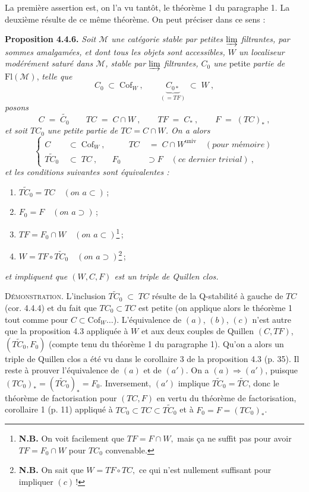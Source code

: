 \documentclass[11pt]{article}
\newcommand{\printedpage}[1]{\marginpar{\footnotesize p.~#1}}
\newcommand{\msp}[1]{\marginpar{\footnotesize [#1]}}
\newcommand{\Fl}{\mathrm{Fl}}
\newcommand{\Cof}{\mathrm{Cof}}
\newcommand{\univ}{\mathrm{univ}}
\begin{document}
La première assertion est, on l'a vu tantôt, le théorème 1 du paragraphe 1. La deuxième résulte de ce même théorème. On peut préciser dans ce sens :

\textbf{Proposition 4.4.6.} \textit{Soit $\mathcal{M}$ une catégorie stable par petites $\varinjlim$ filtrantes, par sommes amalgamées, et dont tous les objets sont accessibles, $W$ un localiseur}
\msp{page 42}
\textit{modérément saturé dans $\mathcal{M}$, stable par $\varinjlim$ filtrantes, $C_0$ une} petite \textit{partie de} $\Fl(\mathcal{M})$, \textit{telle que}
\[
C_0\;\subset\;\Cof_W\ ,\qquad \underbrace{C_{0*}}_{(=TF)}\;\subset\;W\ ,
\]
\printedpage{28}
\textit{posons}
\[
C\;=\;\widetilde{C_0}\qquad TC\;=\;C\cap W\ ,\qquad TF\;=\;C_*\ ,\qquad F\;=\;(TC)_*\ ,
\]
\textit{et soit $TC_0$ une petite partie de $TC=C\cap W$. On a alors}
\[
\left\{
\begin{aligned}
C &\;\subset\;\Cof_W\ , &\qquad TC &\;=\;C\cap W^{\univ}\quad(\textit{pour mémoire})\\
\widetilde{TC_0} &\;\subset\;TC\ , & F_0 &\supset F\quad(\textit{ce dernier trivial})\ ,
\end{aligned}
\right.
\tag*{(4.4.6)}
\]
\textit{et les conditions suivantes sont équivalentes :}
\begin{enumerate}[leftmargin=*]
\item[a)] $\widetilde{TC_0}=TC\quad(\textit{on a}\subset)$\,;
\item[a$'$)] $F_0=F\quad(\textit{on a}\supset)$\,;
\item[b)] $TF=F_0\cap W\quad(\textit{on a}\subset)$\footnote[14]{\textbf{N.B.} On voit facilement que $\boxed{TF=F\cap W,}$ mais ça ne suffit pas pour avoir $TF=F_0\cap W$ pour $TC_0$ convenable.}\,;
\item[c)] $W=TF\circ\widetilde{TC_0}\quad(\textit{on a}\supset)$\footnote[15]{\textbf{N.B.} On sait que $\boxed{W=TF\circ TC,}$ ce qui n'est nullement suffisant pour impliquer $(c)$\,!}\,;
\end{enumerate}
\textit{et impliquent que $(W,C,F)$ est un triple de Quillen clos.}

\textsc{Démonstration.} L'inclusion $\widetilde{TC_0}\;\subset\;TC$ résulte de la Q-stabilité à gauche de $TC$ (cor. 4.4.4) et du fait que $TC_0\subset TC$ est petite (on applique alors le théorème 1 tout comme pour $C\subset\Cof_W\ldots$). L'équivalence de $(a)$, $(b)$, $(c)$ n'est autre que la proposition 4.3 appliquée à $W$ et aux deux couples de Quillen $(C,TF)$, $(\widetilde{TC_0},F_0)$ (compte tenu du théorème 1 du paragraphe 1). Qu'on a alors un triple de Quillen clos a été vu dans le corollaire 3 de la proposition 4.3 (p. 35). Il reste à prouver l'équivalence de $(a)$ et de $(a')$. On a $(a)\Longrightarrow(a')$, puisque $(TC_0)_*=(\widetilde{TC_0})_*=F_0$. Inversement, $(a')$ implique $\widetilde{TC_0}=\widetilde{TC}$, donc le théorème de factorisation pour $(TC,F)$ en vertu du théorème de factorisation, corollaire 1 (p. 11) appliqué à $TC_0\subset TC\subset\widetilde{TC_0}$ et à $F_0=F=(TC_0)_*$.
\end{document}

